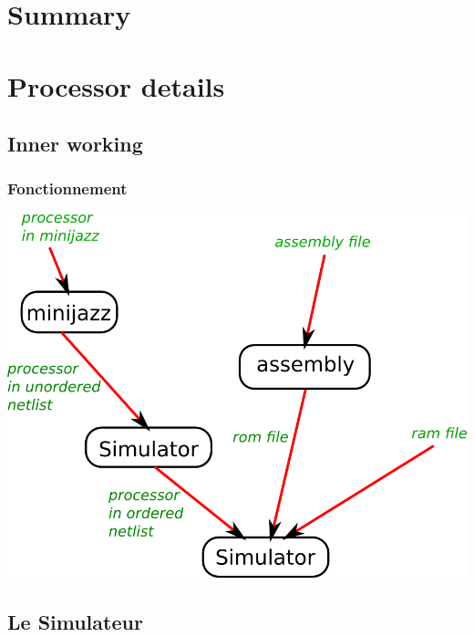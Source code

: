 \documentclass[c]{beamer}
\author{Nicolas Blanchard, Axel Davy et Marc Heinrich}
\institute{Ecole Normale Supérieure}
\date{Mardi 22 janvier 2013}
\begin{document}
\begin{frame}
  \maketitle
\end{frame}

\section{Summary}
\begin{frame}
  \tableofcontents
\end{frame}

\section{Processor details}

\subsection{Inner working}
\begin{frame}
  \frametitle{Fonctionnement}
  \includegraphics[scale=0.4]{schema_fonctionnement.png}
\end{frame}

\subsection{Le Simulateur}
\end{document}
